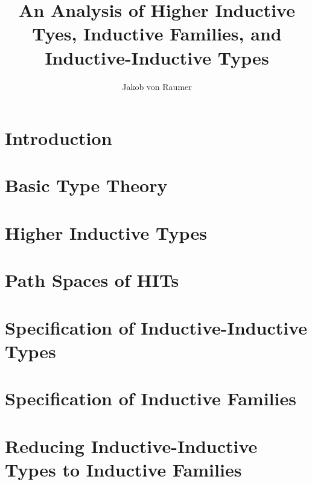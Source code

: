 \documentclass[12pt,headings=optiontohead,openany,oneside,a4paper]{book}
\theoremstyle{definition}
\begin{document}
\title{An Analysis of Higher Inductive Tyes, Inductive Families, and Inductive-Inductive Types}
\author{Jakob von Raumer}

\frontmatter
\maketitle

\tableofcontents

\mainmatter

\chapter{Introduction}



\chapter{Basic Type Theory}



\chapter{Higher Inductive Types}



\chapter{Path Spaces of HITs}

\chapter{Specification of Inductive-Inductive Types}\label{chp:iit}


%

\chapter{Specification of Inductive Families}\label{chp:if}



\chapter{Reducing Inductive-Inductive Types to Inductive Families}\label{chp:red}





\end{document}
